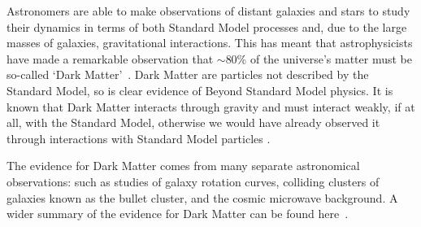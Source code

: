 Astronomers are able to make observations of distant galaxies and stars
to study their dynamics in terms of both Standard Model processes
and, due to the large masses of galaxies, gravitational interactions.
This has meant that astrophysicists have made a remarkable observation that
$\sim$80\% of the universe's matter must be so-called `Dark Matter'~\cite{theo-bsm_dm_peskin}.
Dark Matter are particles not described by the Standard Model,
so is clear evidence of Beyond Standard Model physics.
It is known that Dark Matter interacts through gravity
and must interact weakly, if at all, with the Standard Model,
otherwise we would have already observed it through interactions with Standard Model particles .

The evidence for Dark Matter comes from many separate astronomical observations:
such as studies of
galaxy rotation curves,
colliding clusters of galaxies known as the bullet cluster,
and the cosmic microwave background.
A wider summary of the evidence for Dark Matter can be found here~\cite{theo-bsm_dm_evidence}.

